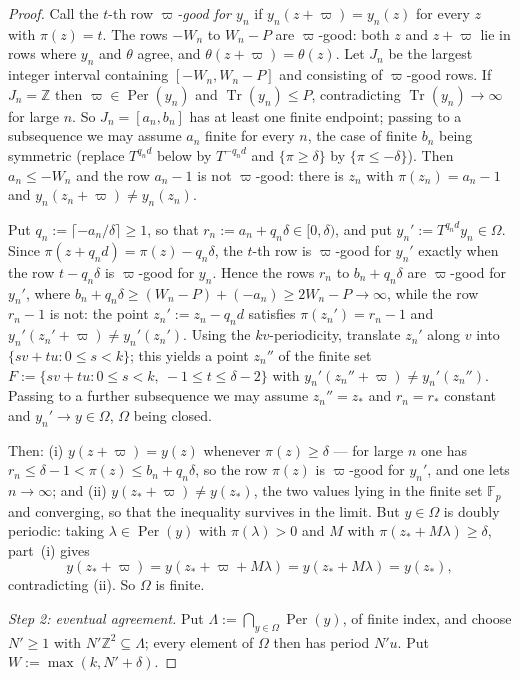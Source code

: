 \documentclass[11pt,reqno]{amsart}
\theoremstyle{plain}
\theoremstyle{definition}
\theoremstyle{remark}
\theoremstyle{plain}
\theoremstyle{remark}
\theoremstyle{definition}
\numberwithin{equation}{section}
\DeclareMathOperator{\Per}{Per}
\DeclareMathOperator{\Tr}{Tr}
\newcommand{\Z}{\mathbb{Z}}
\newcommand{\Fp}{\mathbb{F}_p}
\begin{document}
\begin{proof}
Call the $t$-th row \emph{$\varpi$-good for $y_n$} if $y_n(z+\varpi)=y_n(z)$ for
every $z$ with $\pi(z)=t$.  The rows $-W_n$ to $W_n-P$ are $\varpi$-good: both
$z$ and $z+\varpi$ lie in rows where $y_n$ and $\theta$ agree, and
$\theta(z+\varpi)=\theta(z)$.  Let $J_n$ be the largest integer interval
containing $[-W_n,W_n-P]$ and consisting of $\varpi$-good rows.  If
$J_n=\Z$ then $\varpi\in\Per(y_n)$ and $\Tr(y_n)\le P$, contradicting
$\Tr(y_n)\to\infty$ for large $n$.  So $J_n=[a_n,b_n]$ has at least one finite
endpoint; passing to a subsequence we may assume $a_n$ finite for every $n$, the
case of finite $b_n$ being symmetric (replace $T^{q_nd}$ below by $T^{-q_nd}$
and $\{\pi\ge\delta\}$ by $\{\pi\le-\delta\}$).  Then $a_n\le-W_n$ and the row
$a_n-1$ is not $\varpi$-good: there is $z_n$ with $\pi(z_n)=a_n-1$ and
$y_n(z_n+\varpi)\ne y_n(z_n)$.

Put $q_n:=\lceil-a_n/\delta\rceil\ge1$, so that $r_n:=a_n+q_n\delta\in[0,\delta)$,
and put $y_n':=T^{q_nd}y_n\in\Omega$.  Since $\pi(z+q_nd)=\pi(z)-q_n\delta$, the
$t$-th row is $\varpi$-good for $y_n'$ exactly when the row $t-q_n\delta$ is
$\varpi$-good for $y_n$.  Hence the rows $r_n$ to $b_n+q_n\delta$ are
$\varpi$-good for $y_n'$, where
$b_n+q_n\delta\ge(W_n-P)+(-a_n)\ge2W_n-P\to\infty$, while the row $r_n-1$ is
not: the point $z_n':=z_n-q_nd$ satisfies $\pi(z_n')=r_n-1$ and
$y_n'(z_n'+\varpi)\ne y_n'(z_n')$.  Using the $kv$-periodicity, translate $z_n'$
along $v$ into $\{sv+tu:0\le s<k\}$; this yields a point $z_n''$ of the finite
set $F:=\{sv+tu:0\le s<k,\ -1\le t\le\delta-2\}$ with
$y_n'(z_n''+\varpi)\ne y_n'(z_n'')$.  Passing to a further subsequence we may
assume $z_n''=z_*$ and $r_n=r_*$ constant and $y_n'\to y\in\Omega$, $\Omega$
being closed.

Then: \textup{(i)} $y(z+\varpi)=y(z)$ whenever $\pi(z)\ge\delta$ — for large $n$
one has $r_n\le\delta-1<\pi(z)\le b_n+q_n\delta$, so the row $\pi(z)$ is
$\varpi$-good for $y_n'$, and one lets $n\to\infty$; and \textup{(ii)}
$y(z_*+\varpi)\ne y(z_*)$, the two values lying in the finite set $\Fp$ and
converging, so that the inequality survives in the limit.  But $y\in\Omega$ is
doubly periodic: taking $\lambda\in\Per(y)$ with $\pi(\lambda)>0$ and $M$ with
$\pi(z_*+M\lambda)\ge\delta$, part~(i) gives
\[y(z_*+\varpi)=y(z_*+\varpi+M\lambda)=y(z_*+M\lambda)=y(z_*),\]
contradicting (ii).  So $\Omega$ is finite.

\emph{Step 2: eventual agreement.}  Put $\Lambda:=\bigcap_{y\in\Omega}\Per(y)$,
of finite index, and choose $N'\ge1$ with $N'\Z^2\subseteq\Lambda$; every
element of $\Omega$ then has period $N'u$.  Put $W:=\max(k,N'+\delta)$.


\end{proof}
\end{document}
